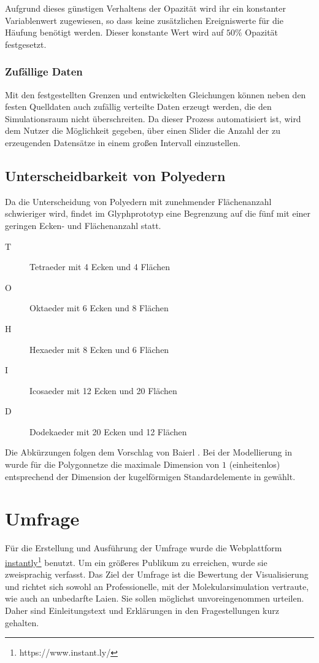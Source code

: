 Aufgrund dieses günstigen Verhaltens der Opazität wird ihr ein konstanter Variablenwert zugewiesen, so dass keine zusätzlichen Ereigniswerte für die Häufung benötigt werden. Dieser konstante Wert wird auf $50\%$ Opazität festgesetzt.

\subsubsection*{Zufällige Daten}
Mit den festgestellten Grenzen und entwickelten Gleichungen können neben den festen Quelldaten auch zufällig verteilte Daten erzeugt werden, die den Simulationsraum nicht überschreiten. Da dieser Prozess automatisiert ist, wird dem Nutzer die Möglichkeit gegeben, über einen Slider die Anzahl der zu erzeugenden Datensätze in einem großen Intervall einzustellen.

\subsection*{Unterscheidbarkeit von Polyedern}\label{sec:polyeder}
Da die Unterscheidung von Polyedern mit zunehmender Flächenanzahl schwieriger wird, findet im Glyphprototyp eine Begrenzung auf die fünf  mit einer geringen Ecken- und Flächenanzahl statt.
\begin{description}
	\item[T] Tetraeder mit 4 Ecken und 4 Flächen
	\item[O] Oktaeder mit 6 Ecken und 8 Flächen
	\item[H] Hexaeder mit 8 Ecken und 6 Flächen
	\item[I] Icosaeder mit 12 Ecken und 20 Flächen
	\item[D] Dodekaeder mit 20 Ecken und 12 Flächen
\end{description}
Die Abkürzungen folgen dem Vorschlag von Baierl \cite[S.~42]{KonvexePolyeder}. Bei der Modellierung in  wurde für die Polygonnetze die maximale Dimension von $1$ (einheitenlos) entsprechend der Dimension der kugelförmigen Standardelemente in  gewählt.

\section{Umfrage}\label{sec:umfrage}
Für die Erstellung und Ausführung der Umfrage wurde die Webplattform \href{https://www.instant.ly/}{instantly}\footnote{https://www.instant.ly/} benutzt. Um ein größeres Publikum zu erreichen, wurde sie zweisprachig verfasst. Das Ziel der Umfrage ist die Bewertung der Visualisierung und richtet sich sowohl an Professionelle, mit der Molekularsimulation vertraute, wie auch an unbedarfte Laien. Sie sollen möglichst unvoreingenommen urteilen. Daher sind Einleitungstext und Erklärungen in den Fragestellungen kurz gehalten.

